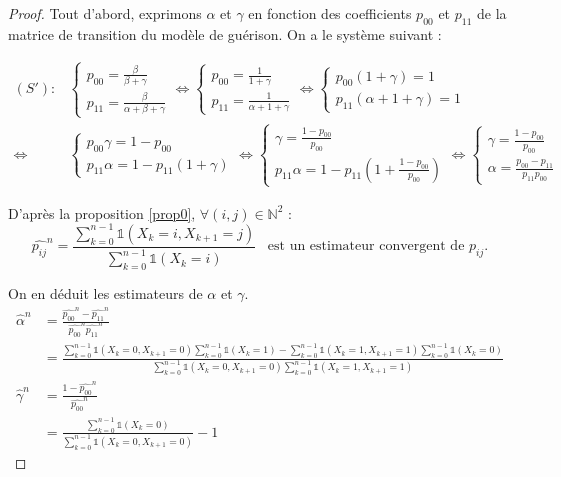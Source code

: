 \documentclass[12pt,a4paper]{report}
\theoremstyle{remark}
\begin{document}
\begin{proof}
Tout d'abord, exprimons $\alpha$ et $\gamma$ en fonction des coefficients $p_{00}$ et $p_{11}$ de la matrice de transition du modèle de guérison.
On a le système suivant :

\begin{align*}
(S') : &\left\{
\begin{array}{ll}
        p_{00} = \frac{\beta}{\beta+\gamma} \\
        p_{11} = \frac{\beta}{\alpha+\beta+\gamma}
    \end{array}
\right.
\iff\left\{
\begin{array}{ll}
          p_{00} = \frac{1}{1+\gamma} \\
        p_{11} = \frac{1}{\alpha+1+\gamma}
    \end{array}
\right.
\iff \left\{
\begin{array}{ll}
         p_{00}(1+\gamma)= 1 \\
        p_{11}(\alpha + 1 +\gamma) =1  \end{array}
\right.\\
\iff &\left\{
\begin{array}{ll}
          p_{00}\gamma= 1-p_{00} \\
        p_{11}\alpha = 1 - p_{11}(1+\gamma)   \end{array}
    \right.
\iff \left\{
\begin{array}{ll}
        \gamma= \frac{1-p_{00}}{p_{00}} \\
       p_{11}\alpha = 1 - p_{11}(1+\frac{1-p_{00}}{p_{00}})  
       \end{array}  
    \right.   
\iff \left\{
\begin{array}{ll}
         \gamma= \frac{1-p_{00}}{p_{00}} \\
        \alpha = \frac{p_{00}-p_{11}}{p_{11}p_{00}}   
    \end{array}    
    \right.      
\end{align*}

D'après la proposition \ref{prop0}, $\forall (i,j) \in \mathbb{N}^2$ : $$\hat{p_{ij}}^n = \frac{\sum\limits_{k=0}^{n-1} \mathds{1}(X_k=i, X_{k+1}=j)}{\sum\limits_{k=0}^{n-1} \mathds{1}(X_k=i)} \, \, \, \text{ est un estimateur convergent de } p_{ij}.$$

On en déduit les estimateurs de $\alpha$ et $\gamma$.
\begin{align*}
\hat{\alpha}^n &= \frac{\hat{p_{00}}^n-\hat{p_{11}}^n}{\hat{p_{00}}^n\hat{p_{11}}^n} \\
&= \frac{\sum\limits_{k=0}^{n-1} \mathds{1}(X_k=0, X_{k+1}=0)\sum\limits_{k=0}^{n-1} \mathds{1}(X_k=1)-\sum\limits_{k=0}^{n-1} \mathds{1}(X_k=1, X_{k+1}=1)\sum\limits_{k=0}^{n-1} \mathds{1}(X_k=0)}{\sum\limits_{k=0}^{n-1} \mathds{1}(X_k=0, X_{k+1}=0)\sum\limits_{k=0}^{n-1} \mathds{1}(X_k=1, X_{k+1}=1)}\\
\hat{\gamma}^n &= \frac{1- \hat{p_{00}}^n}{\hat{p_{00}}^n} \\
&= \frac{{\sum\limits_{k=0}^{n-1} \mathds{1}(X_k=0)}}{{\sum\limits_{k=0}^{n-1} \mathds{1}(X_k=0,X_{k+1}=0)}} - 1
\end{align*}
\end{proof}
\end{document}
